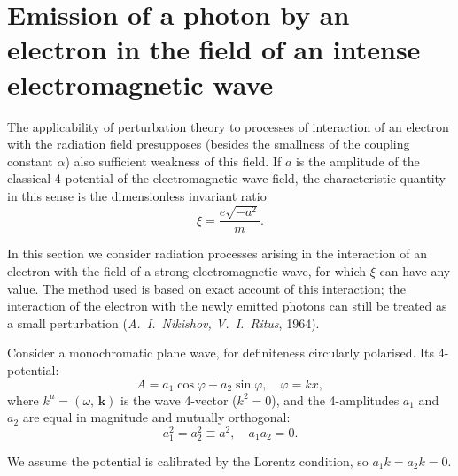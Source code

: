 
\section{Emission of a photon by an electron in the field of an intense electromagnetic wave}


The applicability of perturbation theory to processes of interaction of an electron with the radiation field presupposes (besides the smallness of the coupling constant $\alpha$) also sufficient weakness of this field. If $a$ is the amplitude of the classical 4-potential of the electromagnetic wave field, the characteristic quantity in this sense is the dimensionless invariant ratio
\begin{equation}
\xi = \frac{e\sqrt{-a^2}}{m}.
\label{eq:101.1}
\end{equation}

In this section we consider radiation processes arising in the interaction of an electron with the field of a strong electromagnetic wave, for which $\xi$ can have any value. The method used is based on exact account of this interaction; the interaction of the electron with the newly emitted photons can still be treated as a small perturbation (\emph{A.~I.~Nikishov, V.~I.~Ritus}, 1964).

Consider a monochromatic plane wave, for definiteness circularly polarised. Its 4-potential:
\begin{equation}
A = a_1 \cos\varphi + a_2 \sin\varphi, \quad \varphi = kx,
\label{eq:101.2}
\end{equation}
where $k^\mu = (\omega,\,\mathbf{k})$ is the wave 4-vector ($k^2 = 0$), and the 4-amplitudes $a_1$ and $a_2$ are equal in magnitude and mutually orthogonal:
\[
a_1^2 = a_2^2 \equiv a^2, \quad a_1 a_2 = 0.
\]


We assume the potential is calibrated by the Lorentz condition, so $a_1 k = a_2 k = 0$.

